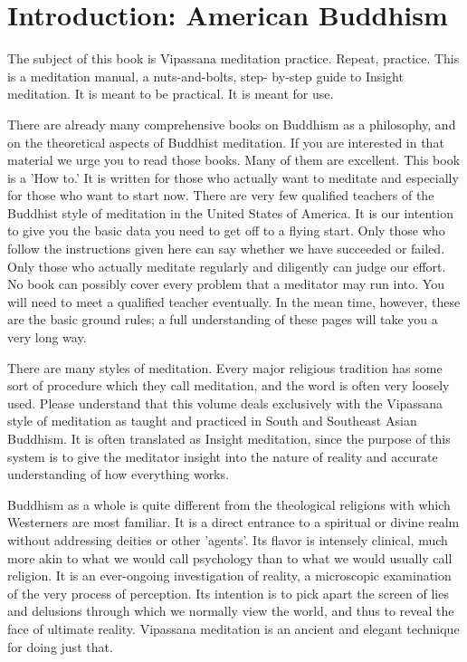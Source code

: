 \chapter{Introduction: American Buddhism}
The subject of this book is Vipassana meditation practice. Repeat, practice. This is a meditation manual, a nuts-and-bolts, step-
by-step guide to Insight meditation. It is meant to be practical. It is meant for use.

There are already many comprehensive books on Buddhism as a philosophy, and on the theoretical aspects of Buddhist
meditation. If you are interested in that material we urge you to read those books. Many of them are excellent. This book is a
'How to.' It is written for those who actually want to meditate and especially for those who want to start now. There are very few
qualified teachers of the Buddhist style of meditation in the United States of America. It is our intention to give you the basic data
you need to get off to a flying start. Only those who follow the instructions given here can say whether we have succeeded or
failed. Only those who actually meditate regularly and diligently can judge our effort. No book can possibly cover every problem
that a meditator may run into. You will need to meet a qualified teacher eventually. In the mean time, however, these are the basic
ground rules; a full understanding of these pages will take you a very long way.

There are many styles of meditation. Every major religious tradition has some sort of procedure which they call meditation, and
the word is often very loosely used. Please understand that this volume deals exclusively with the Vipassana style of meditation as
taught and practiced in South and Southeast Asian Buddhism. It is often translated as Insight meditation, since the purpose of this
system is to give the meditator insight into the nature of reality and accurate understanding of how everything works.

Buddhism as a whole is quite different from the theological religions with which Westerners are most familiar. It is a direct
entrance to a spiritual or divine realm without addressing deities or other 'agents'. Its flavor is intensely clinical, much more akin
to what we would call psychology than to what we would usually call religion. It is an ever-ongoing investigation of reality, a
microscopic examination of the very process of perception. Its intention is to pick apart the screen of lies and delusions through
which we normally view the world, and thus to reveal the face of ultimate reality. Vipassana meditation is an ancient and elegant
technique for doing just that.

